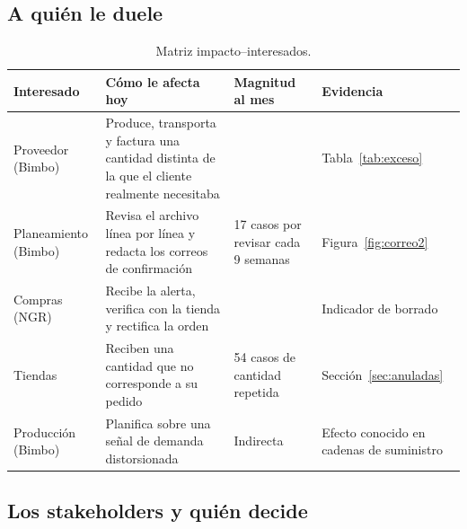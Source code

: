 \subsection{A quién le duele}

\begin{table}[htbp]
\centering
\caption{Matriz impacto--interesados.}
\label{tab:impacto}
\small
\begin{tabularx}{\textwidth}{@{}L{2.6cm}YL{2.6cm}L{2.8cm}@{}}
\toprule
\textbf{Interesado} & \textbf{Cómo le afecta hoy} & \textbf{Magnitud al mes} & \textbf{Evidencia} \\
\midrule
Proveedor (Bimbo) & Produce, transporta y factura una cantidad distinta de la que el cliente realmente necesitaba &  & Tabla~\ref{tab:exceso} \\
Planeamiento (Bimbo) & Revisa el archivo línea por línea y redacta los correos de confirmación & 17 casos por revisar cada 9 semanas & Figura~\ref{fig:correo2} \\
Compras (NGR) & Recibe la alerta, verifica con la tienda y rectifica la orden &  & Indicador de borrado \\
Tiendas & Reciben una cantidad que no corresponde a su pedido & 54 casos de cantidad repetida & Sección~\ref{sec:anuladas} \\
Producción (Bimbo) & Planifica sobre una señal de demanda distorsionada & Indirecta & Efecto conocido en cadenas de suministro \cite{lee1997} \\
\bottomrule
\end{tabularx}
\end{table}

\subsection{Los stakeholders y quién decide}

